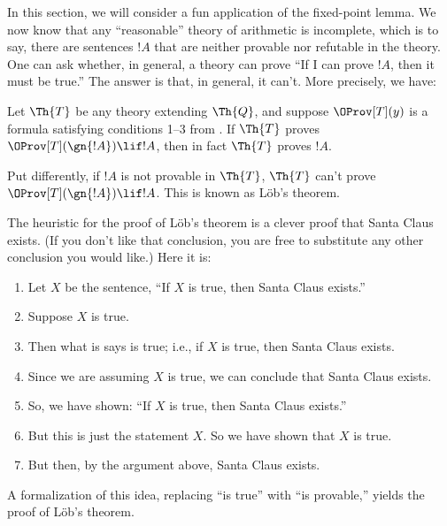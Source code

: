 \documentclass[../../include/open-logic-section]{subfiles}
\begin{document}


\newcommand{\pt}{\fn{Prov}_T}

In this section, we will consider a fun application of the fixed-point
lemma. We now know that any ``reasonable'' theory of arithmetic is
incomplete, which is to say, there are sentences $!A$ that are neither
provable nor refutable in the theory. One can ask whether, in general,
a theory can prove ``If I can prove $!A$, then it must be true.'' The
answer is that, in general, it can't. More precisely, we have:

\begin{thm}
  Let $\Th{T}$ be any theory extending $\Th{Q}$, and suppose
  $\OProv[T](y)$ is a formula satisfying conditions 1--3 from
  . If $\Th{T}$ proves $\OProv[T](\gn{!A}) \lif !A$,
  then in fact $\Th{T}$ proves $!A$.
\end{thm}
Put differently, if $!A$ is not provable in $\Th{T}$, $\Th{T}$ can't
prove $\OProv[T](\gn{!A}) \lif !A$. This is known as L\"ob's theorem.

The heuristic for the proof of L\"ob's theorem is a clever proof that
Santa Claus exists. (If you don't like that conclusion, you are free
to substitute any other conclusion you would like.) Here it is:
\begin{enumerate}
\item Let $X$ be the sentence, ``If $X$ is true, then Santa Claus
  exists.''
\item Suppose $X$ is true.
\item Then what is says is true; i.e., if $X$ is true, then
  Santa Claus exists.
\item Since we are assuming $X$ is true, we can conclude that
  Santa Claus exists.
\item So, we have shown: ``If $X$ is true, then Santa Claus exists.''
\item But this is just the statement $X$. So we have shown that $X$ is
  true.
\item But then, by the argument above, Santa Claus exists.
\end{enumerate}
A formalization of this idea, replacing ``is true'' with ``is
provable,'' yields the proof of L\"ob's theorem. 
\end{document}
